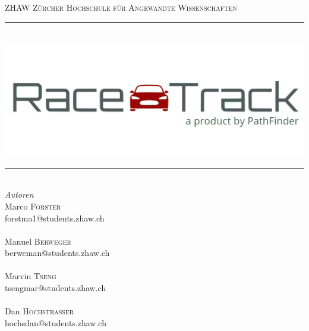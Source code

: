 \begin{titlepage} %
	\newcommand{\HRule}{\rule{\linewidth}{0.2mm}} %
	
	\center %
	
	\textsc{\LARGE ZHAW Zürcher Hochschule für Angewandte Wissenschaften}\\[1.5cm] %
	
	\HRule\\[0.6cm]
	\includegraphics[scale=0.4]{img/RaceTrack_Logo.png}
	\HRule\\[1.5cm]
	
	{\large\textit{Autoren}}\\[0.6cm]
	Marco \textsc{Forster}\\ %
	forstma1@students.zhaw.ch\\~\\
	Manuel \textsc{Berweger}\\ %
	berweman@students.zhaw.ch\\~\\
	Marvin \textsc{Tseng}\\ %
	tsengmar@students.zhaw.ch\\~\\
	Dan \textsc{Hochstrasser}\\ %
	hochsdan@students.zhaw.ch\\~\\
	

\end{titlepage}
